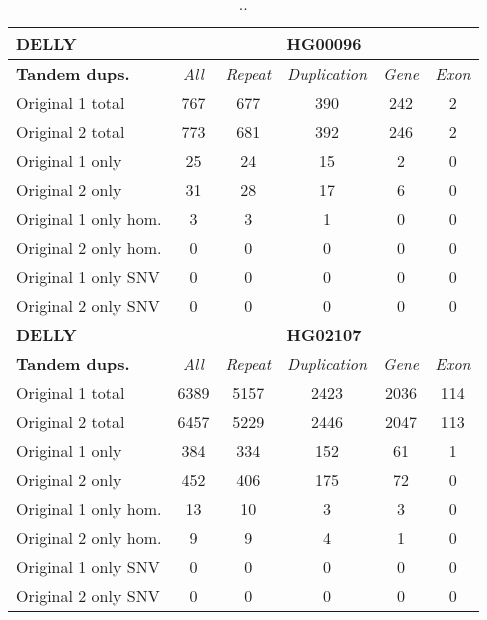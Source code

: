\begin{table}[htb]
\begin{center}
\begin{tabular}{|l|c||c|c|c|c|}
\hline
{\bf DELLY} & \multicolumn{5}{|c|}{\bf HG00096} \\
\hline
\cline{2-6}
{\bf Tandem dups.} & {\it All} & {\it Repeat} & {\it Duplication} & {\it Gene} & {\it Exon} \\
\hline
Original 1 total & 767 & 677 & 390 & 242 & 2\\ 
\hline
Original 2 total & 773 & 681 & 392 & 246 & 2\\ 
\hline
Original 1 only & 25 & 24 & 15 & 2 & 0\\ 
\hline
Original 2 only & 31 & 28 & 17 & 6 & 0\\ 
\hline
Original 1 only hom. & 3 & 3 & 1 & 0 & 0\\ 
\hline
Original 2 only hom. & 0 & 0 & 0 & 0 & 0\\ 
\hline
Original 1 only SNV & 0 & 0 & 0 & 0 & 0\\ 
\hline
Original 2 only SNV & 0 & 0 & 0 & 0 & 0\\ 
\hline
\hline
{\bf DELLY} & \multicolumn{5}{|c|}{\bf HG02107} \\
\hline
\cline{2-6}
{\bf Tandem dups.} & {\it All} & {\it Repeat} & {\it Duplication} & {\it Gene} & {\it Exon} \\
\hline
Original 1 total & 6389 & 5157 & 2423 & 2036 & 114\\ 
\hline
Original 2 total & 6457 & 5229 & 2446 & 2047 & 113\\ 
\hline
Original 1 only & 384 & 334 & 152 & 61 & 1\\ 
\hline
Original 2 only & 452 & 406 & 175 & 72 & 0\\ 
\hline
Original 1 only hom. & 13 & 10 & 3 & 3 & 0\\ 
\hline
Original 2 only hom. & 9 & 9 & 4 & 1 & 0\\ 
\hline
Original 1 only SNV & 0 & 0 & 0 & 0 & 0\\ 
\hline
Original 2 only SNV & 0 & 0 & 0 & 0 & 0\\ 
\hline
\end{tabular}
\end{center}
\caption{ .. }
\label{tab:orig-vs-shuf-delly-dups}
\end{table}

